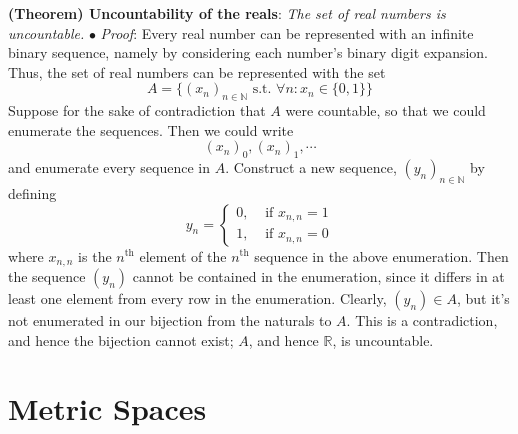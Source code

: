 \documentclass{article}
\newcommand*{\tb}{\textbf}
\newcommand*{\ti}{\textit}
\newcommand*{\n}{\newline}
\newcommand*{\nn}{\newline \newline}
\newcommand*{\Pf}{\indent \ensuremath{\bullet} \textit{Proof}: }
\newcommand*{\N}{\mathbb{N}}
\newcommand*{\R}{\mathbb{R}}
\newcommand*{\st}{\text{ s.t. }}
\begin{document}
\nn
\tb{(Theorem) Uncountability of the reals}: \ti{The set of real numbers is uncountable.}
\n
\Pf Every real number can be represented with an infinite binary sequence, namely by considering each number's binary digit expansion. Thus, the set of real numbers can be represented with the set
    $$ A = \{ ( x_n )_{n \in \N} \st \forall n: x_n \in \{ 0, 1 \} \} $$
Suppose for the sake of contradiction that $ A $ were countable, so that we could enumerate the sequences. Then we could write
    $$ ( x_n )_0, ( x_n )_1, \cdots $$
and enumerate every sequence in $ A $. Construct a new sequence, $ ( y_n )_{n \in \N} $ by defining
    $$ y_n = \begin{cases}
        0, &\text{ if } x_{n, n} = 1 \\
        1, &\text{ if } x_{n, n} = 0
    \end{cases} $$
where $ x_{n, n} $ is the $ n^{\text{th}} $ element of the $ n^{\text{th}} $ sequence in the above enumeration. Then the sequence $ ( y_n ) $ cannot be contained in the enumeration, since it differs in at least one element from every row in the enumeration. Clearly, $ ( y_n ) \in A $, but it's not enumerated in our bijection from the naturals to $ A $. This is a contradiction, and hence the bijection cannot exist; $ A $, and hence $ \R $, is uncountable. \qedsymbol

\section{Metric Spaces}
\end{document}

